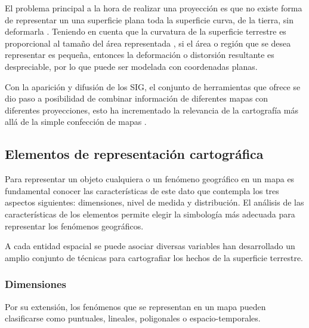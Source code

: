 El problema principal a la hora de realizar una proyección es que no existe forma de representar
un una superficie plana toda la superficie curva, de la tierra, sin deformarla
\citep{llopis2006sistemas}. Teniendo en cuenta que la curvatura de la superficie terrestre es
proporcional al tamaño del área representada \citep{llopis2006sistemas}, si el área o región que se
desea representar es pequeña, entonces la deformación o distorsión resultante es despreciable, por
lo que puede ser modelada con coordenadas planas.

Con la aparición y difusión de los SIG, el conjunto de herramientas que ofrece se dio paso a
posibilidad de combinar información de diferentes mapas con diferentes proyecciones, esto ha
incrementado la relevancia de la cartografía más allá de la simple confección de mapas
\citep{llopis2006sistemas}.


\subsection{Elementos de representación cartográfica}
Para representar un objeto cualquiera o un fenómeno geográfico en un mapa es fundamental conocer
las características de este dato que contempla los tres aspectos siguientes: dimensiones, nivel de
medida y distribución. El análisis de las características de los elementos permite elegir la
simbología más adecuada para representar los fenómenos geográficos.

A cada entidad espacial se puede asociar diversas variables han desarrollado un amplio conjunto de
técnicas para cartografiar los hechos de la superficie terrestre.

\subsubsection{Dimensiones}
Por su extensión, los fenómenos que se representan en un mapa pueden clasificarse como puntuales,
lineales, poligonales o espacio-temporales.

